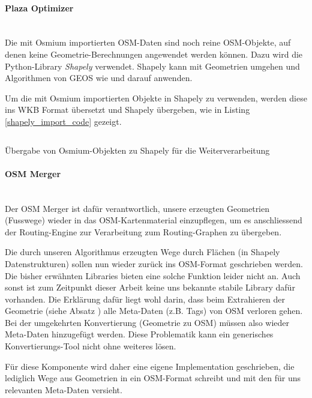 \paragraph{Plaza Optimizer}\label{par:Plaza Optimizer}~\\
Die mit Osmium importierten \ac{OSM}-Daten sind noch reine \ac{OSM}-Objekte, auf denen keine Geometrie-Berechnungen angewendet werden können. Dazu wird die Python-Library \emph{Shapely}\cite{shapely} verwendet. Shapely kann mit Geometrien umgehen und Algorithmen von \ac{GEOS} wie  und  darauf anwenden.

Um die mit Osmium importierten Objekte in Shapely zu verwenden, werden diese ins \ac{WKB} Format übersetzt und Shapely übergeben, wie in Listing \ref{shapely_import_code} gezeigt.

\begin{listing}[ht]
    \inputminted{python}{projectdoc/listing/shapely_import.py}
    \caption[Einlesen OSM Objekte in Shapely]{Übergabe von Osmium-Objekten zu Shapely für die Weiterverarbeitung}
    \label{shapely_import_code}
\end{listing}



\paragraph{OSM Merger}\label{par:OSM Merger}~\\
Der OSM Merger ist dafür verantwortlich, unsere erzeugten Geometrien (Fusswege) wieder in das \ac{OSM}-Kartenmaterial einzupflegen, um es anschliessend der Routing-Engine zur Verarbeitung zum Routing-Graphen zu übergeben.

Die durch unseren Algorithmus erzeugten Wege durch Flächen (in Shapely Datenstrukturen) sollen nun wieder zurück ins \ac{OSM}-Format geschrieben werden. Die bisher erwähnten Libraries bieten eine solche Funktion leider nicht an. Auch sonst ist zum Zeitpunkt dieser Arbeit keine uns bekannte stabile Library dafür vorhanden. Die Erklärung dafür liegt wohl darin, dass beim Extrahieren der Geometrie (siehe Absatz ) alle Meta-Daten (z.B. Tags) von \ac{OSM} verloren gehen. Bei der umgekehrten Konvertierung (Geometrie zu \ac{OSM}) müssen also wieder Meta-Daten hinzugefügt werden. Diese Problematik kann ein generisches Konvertierungs-Tool nicht ohne weiteres lösen.

Für diese Komponente wird daher eine eigene Implementation geschrieben, die lediglich Wege aus Geometrien in ein \ac{OSM}-Format schreibt und mit den für uns relevanten Meta-Daten versieht.

